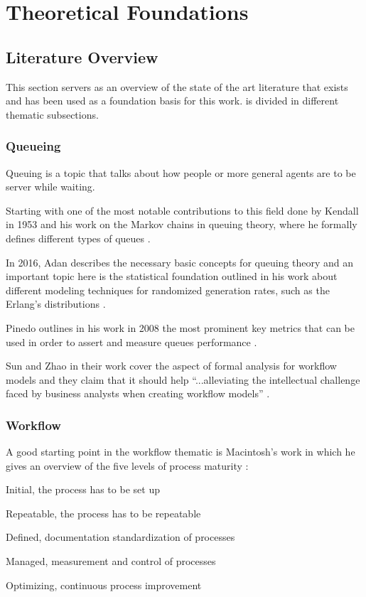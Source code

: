 \documentclass{seal_thesis}
\begin{document}
\chapter{Theoretical Foundations}
\label{ch:foundations}

\section{Literature Overview}
\label{sec:literature_overview}

This section servers as an overview of the state of the art literature that exists and has been used as a foundation basis for this work.  is divided in different thematic subsections.

\subsection{Queueing}

Queuing is a topic that talks about how people or more general agents are to be server while waiting.

Starting with one of the most notable contributions to this field done by Kendall in 1953 and his work on the Markov chains in queuing theory, where he formally defines different types of queues \cite{Kendall1953}.

In 2016, Adan describes the necessary basic concepts for queuing theory and an important topic here is the statistical foundation outlined in his work about different modeling techniques for randomized generation rates, such as the Erlang's distributions \cite{Adan2016}.

Pinedo outlines in his work in 2008 the most prominent key metrics that can be used in order to assert and measure queues performance \cite{Pinedo2008}.

Sun and Zhao in their work cover the aspect of formal analysis for workflow models and they claim that it should help ``...alleviating the intellectual challenge faced by business analysts when creating workflow models'' \cite{Sun2013}.

\subsection{Workflow}
\label{subsec:workflow}

A good starting point in the workflow thematic is Macintosh's work in which he gives an overview of the five levels of process maturity \cite{Macintosh1993}:
\begin{enumerate*}
	\item Initial, the process has to be set up
	\item Repeatable, the process has to be repeatable
	\item Defined, documentation standardization of processes
	\item Managed, measurement and control of processes
	\item Optimizing, continuous process improvement
\end{enumerate*}
\end{document}
